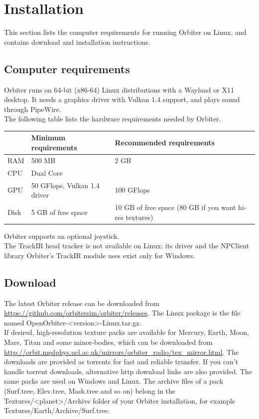 \documentclass[Orbiter User Manual.tex]{subfiles}
\begin{document}
\section{Installation}
\label{sec:installation}
This section lists the computer requirements for running Orbiter on Linux, and contains download and installation instructions.

\subsection{Computer requirements}
Orbiter runs on 64-bit (x86-64) Linux distributions with a Wayland or X11 desktop. It needs a graphics driver with Vulkan 1.4 support, and plays sound through PipeWire.\\
The following table lists the hardware requirements needed by Orbiter.

	\begin{longtable}{ |p{}|p{}|p{}| }
	\hline\rule{0pt}{2ex}
	& \textbf{Minimum requirements} & \textbf{Recommended requirements}\\
	\hline\rule{0pt}{2ex}
	RAM & 500 MB & 2 GB\\
	\hline\rule{0pt}{2ex}
	CPU & Dual Core &\\
	\hline\rule{0pt}{2ex}
	GPU & 50 GFlops, Vulkan 1.4 driver & 100 GFlops\\
	\hline\rule{0pt}{2ex}
	Disk & 5 GB of free space & 10 GB of free space (80 GB if you want hi-res textures)\\
	\hline
	\end{longtable}

\noindent
Orbiter supports an optional joystick.\\
The TrackIR head tracker is not available on Linux: its driver and the NPClient library Orbiter's TrackIR module uses exist only for Windows.

\subsection{Download}
The latest Orbiter release can be downloaded from \url{https://github.com/orbitersim/orbiter/releases}. The Linux package is the file named OpenOrbiter-<version>-Linux.tar.gz.\\
If desired, high-resolution texture packs are available for Mercury, Earth, Moon, Mars, Titan and some minor-bodies, which can be downloaded from \url{http://orbit.medphys.ucl.ac.uk/mirrors/orbiter_radio/tex_mirror.html}. The downloads are provided as torrents for fast and reliable transfer. If you can't handle torrent downloads, alternative http download links are also provided. The same packs are used on Windows and Linux. The archive files of a pack (Surf.tree, Elev.tree, Mask.tree and so on) belong in the Textures/<planet>/Archive folder of your Orbiter installation, for example Textures/Earth/Archive/Surf.tree.
\end{document}
